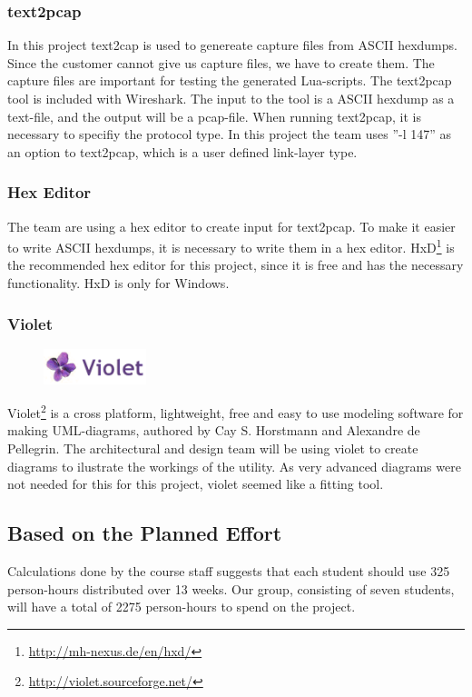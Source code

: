 \subsubsection{text2pcap}
In this project text2cap is used to genereate capture files from ASCII
hexdumps. Since the customer cannot give us capture files, we have to create
them. The capture files are important for testing the generated Lua-scripts.
The text2pcap tool is included with Wireshark. The input to the tool is a ASCII
hexdump as a text-file, and the output will be a pcap-file. When running
text2pcap, it is necessary to specifiy the protocol type. In this project the
team uses ''-l 147'' as an option to text2pcap, which is a user defined
link-layer type.

\subsubsection{Hex Editor}
The team are using a hex editor to create input for text2pcap. To make it
easier to write ASCII hexdumps, it is necessary to write them in a hex editor.
HxD\footnote{\url{http://mh-nexus.de/en/hxd/}} is the recommended hex editor
for this project, since it is free and has the necessary functionality. HxD is
only for Windows.

\subsubsection{Violet}
\begin{figure}
	\vspace{-20pt}
	\includegraphics[width=3cm]{./planning/img/violet_logo}
	\vspace{-20pt}
\end{figure}
Violet\footnote{\url{http://violet.sourceforge.net/}} is a cross platform,
lightweight, free and easy to use modeling software for making UML-diagrams,
authored by Cay S. Horstmann and Alexandre de Pellegrin. The architectural and
design team will be using violet to create diagrams to ilustrate the workings
of the utility. As very advanced diagrams were not needed for this for this
project, violet seemed like a fitting tool.

\subsection{Based on the Planned Effort}
Calculations done by the course staff suggests that each student should use 325 person-hours distributed over 13 weeks. Our group, consisting of seven students, will have a total of 2275 person-hours to spend on the project. 

